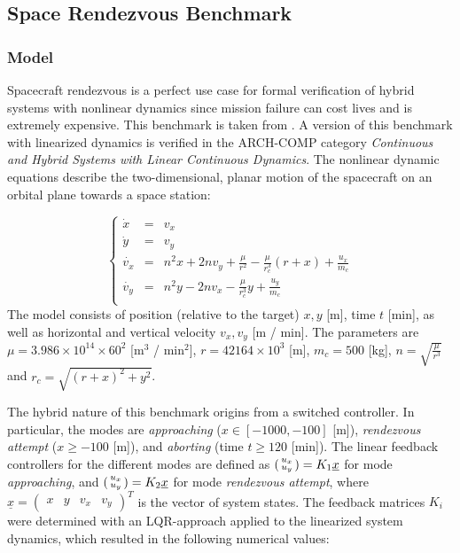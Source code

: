\documentclass[EPiC]{easychair}
\begin{document}
\clearpage

\subsection{Space Rendezvous Benchmark}
\label{sec:spacerendezvous}

\subsubsection{Model}

Spacecraft rendezvous is a perfect use case for formal verification of hybrid systems with nonlinear dynamics since mission failure can cost lives and is extremely expensive. This benchmark is taken from \cite{Chan2017a}. A version of this benchmark with linearized dynamics is verified in the ARCH-COMP category \textit{Continuous and Hybrid Systems with Linear Continuous Dynamics}. The nonlinear dynamic equations describe the two-dimensional, planar motion of the spacecraft on an orbital plane towards a space station:

\[
\left\{
\begin{array}{lcl}
 \dot{x} & = & v_x \\
 \dot{y} & = & v_y \\
 \dot{v_x} & = & n^2 x + 2n v_y + \frac{\mu}{r^2} - \frac{\mu}{r_c^3} (r + x) + \frac{u_x}{m_c} \\
 \dot{v_y} & = & n^2 y - 2n v_x - \frac{\mu}{r_c^3} y + \frac{u_y}{m_c}\\
\end{array}
\right.
\]
The model consists of position (relative to the target) $x, y$ [m], time $t$ [min], as well as horizontal and vertical velocity $v_x, v_y$ [m / min]. The parameters are $\mu = 3.986 \times 10^{14} \times 60^2$ [m$^3$ / min$^2$], $r = 42164 \times 10^3$ [m], $m_c = 500$ [kg], $n = \sqrt{\frac{\mu}{r^3}}$ and $r_c = \sqrt{(r+x)^2 + y^2}$.

\newcommand{\vecT}[1]{\begin{pmatrix}#1\end{pmatrix}^T}
\newcommand{\psmat}[1]{\begin{psmallmatrix}#1\end{psmallmatrix}}

The hybrid nature of this benchmark origins from a switched controller. In particular, the modes are \textit{approaching}
($x \in [-1000, -100]$ [m]), \textit{rendezvous attempt} ($x \ge -100$ [m]), and \textit{aborting} (time $t \ge 120$ [min]). The linear feedback controllers for the different modes are defined as $\psmat{u_x \\ u_y} = K_1 \underline{x}$ for mode \textit{approaching}, and $\psmat{u_x \\ u_y} = K_2 \underline{x}$ for mode \textit{rendezvous attempt}, where $\underline{x} =
\vecT{x & y & v_x & v_y}$ is the vector of system states. The feedback matrices $K_i$ were determined with an LQR-approach applied to the linearized system dynamics, which resulted in the following numerical values:
\end{document}
